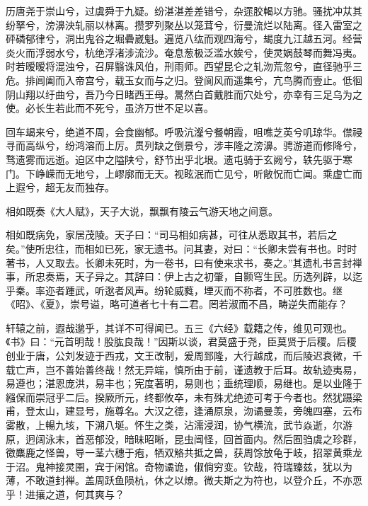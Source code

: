 \documentclass[12pt,UTF8]{ctexbook}
\begin{document}
历唐尧于崇山兮，过虞舜于九疑。纷湛湛差差错兮，杂遝胶輵以方驰。骚扰冲苁其纷拏兮，滂濞泱轧丽以林离。攒罗列聚丛以笼茸兮，衍曼流烂以陆离。径入雷室之砰磷郁律兮，洞出鬼谷之堀礨崴魁。遍览八纮而观四海兮，朅度九江越五河。经营炎火而浮弱水兮，杭绝浮渚涉流沙。奄息葱极泛滥水娭兮，使灵娲鼓琴而舞冯夷。时若暧暧将混浊兮，召屏翳诛风伯，刑雨师。西望昆仑之轧沕荒忽兮，直径驰乎三危。排阊阖而入帝宫兮，载玉女而与之归。登阆风而遥集兮，亢鸟腾而壹止。低徊阴山翔以纡曲兮，吾乃今日睹西王母。暠然白首戴胜而穴处兮，亦幸有三足乌为之使。必长生若此而不死兮，虽济万世不足以喜。



回车朅来兮，绝道不周，会食幽郁。呼吸沆瀣兮餐朝霞，咀噍芝英兮叽琼华。僸祲寻而高纵兮，纷鸿溶而上厉。贯列缺之倒景兮，涉丰隆之滂濞。骋游道而修降兮，骛遗雾而远逝。迫区中之隘陕兮，舒节出乎北垠。遗屯骑于玄阙兮，轶先驱于寒门。下峥嵘而无地兮，上嵺廓而无天。视眩泯而亡见兮，听敞怳而亡闻。乘虚亡而上遐兮，超无友而独存。



相如既奏《大人赋》，天子大说，飘飘有陵云气游天地之间意。



相如既病免，家居茂陵。天子曰：“司马相如病甚，可往从悉取其书，若后之矣。”使所忠往，而相如已死，家无遗书。问其妻，对曰：“长卿未尝有书也。时时著书，人又取去。长卿未死时，为一卷书，曰有使来求书，奏之。”其遗札书言封禅事，所忠奏焉，天子异之。其辞曰：伊上古之初肇，自颢穹生民。历选列辟，以迄乎秦。率迩者踵武，听逖者风声。纷轮威蕤，堙灭而不称者，不可胜数也。继《昭》、《夏》，崇号谥，略可道者七十有二君。罔若淑而不昌，畴逆失而能存？



轩辕之前，遐哉邈乎，其详不可得闻已。五三《六经》载籍之传，维见可观也。《书》曰：“元首明哉！股肱良哉！”因斯以谈，君莫盛于尧，臣莫贤于后稷。后稷创业于唐，公刘发迹于西戎，文王改制，爰周郅隆，大行越成，而后陵迟衰微，千载亡声，岂不善始善终哉！然无异端，慎所由于前，谨遗教于后耳。故轨迹夷易，易遵也；湛恩庞洪，易丰也；宪度著明，易则也；垂统理顺，易继也。是以业隆于繦保而崇冠乎二后。揆厥所元，终都攸卒，未有殊尤绝迹可考于今者也。然犹蹑梁甫，登太山，建显号，施尊名。大汉之德，逢涌原泉，沕谲曼羡，旁魄四塞，云布雾散，上暢九垓，下溯八埏。怀生之类，沾濡浸润，协气横流，武节焱逝，尔游原，迥阔泳末，首恶郁没，暗昧昭晰，昆虫闿怪，回首面内。然后囿驺虞之珍群，徼麋鹿之怪兽，导一茎六穗于疱，牺双觡共抵之兽，获周馀放龟于岐，招翠黄乘龙于沼。鬼神接灵圉，宾于闲馆。奇物谲诡，俶倘穷变。钦哉，符瑞臻兹，犹以为薄，不敢道封禅。盖周跃鱼陨杭，休之以燎。微夫斯之为符也，以登介丘，不亦恧乎！进攘之道，何其爽与？
\end{document}
